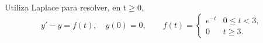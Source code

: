Utiliza Laplace para resolver, en t\ensuremath{\ge}0,
\[y'-y=f(t),\quad y(0)=0,\qquad f(t)=\begin{cases}e^{-t}&0\le t<3,\\0&t\ge3.\end{cases}\]
